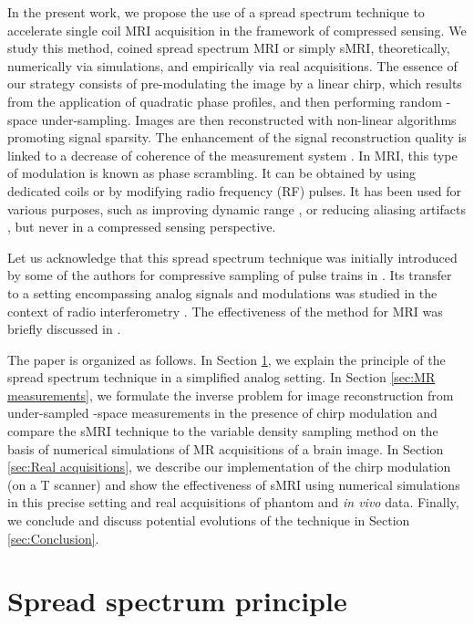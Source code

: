 \documentclass[10pt,draftcls, onecolumn]{IEEEtran}
\begin{document}
In the present work, we propose the use of a spread spectrum technique to accelerate single coil MRI acquisition in the framework of compressed sensing. We study this method, coined spread spectrum MRI or simply sMRI, theoretically, numerically via simulations, and empirically via real acquisitions. The essence of our strategy consists of pre-modulating the image by a linear chirp, which results from the application of quadratic phase profiles, and then performing random -space under-sampling. Images are then reconstructed with non-linear algorithms promoting signal sparsity. The enhancement of the signal reconstruction quality is linked to a decrease of coherence of the measurement system \cite{puy11a, wiaux09b}. In MRI, this type of modulation is known as phase scrambling. It can be obtained by using dedicated coils or by modifying radio frequency (RF) pulses. It has been used for various purposes, such as improving dynamic range \cite{maudsley88, wedeen88}, or reducing aliasing artifacts \cite{pipe95, ito08}, but never in a compressed sensing perspective.

Let us acknowledge that this spread spectrum technique was initially introduced by some of the authors for compressive sampling of pulse trains in \cite{naini09}. Its transfer to a setting encompassing analog signals and modulations was studied in the context of radio interferometry \cite{wiaux09b, wiaux09d, mcewen10}. The effectiveness of the method for MRI was briefly discussed in \cite{puy09, wiaux09c, puy11b}.

The paper is organized as follows. In Section \ref{sec:spread spectrum principle}, we explain the principle of the spread spectrum technique in a simplified analog setting. In Section \ref{sec:MR measurements}, we formulate the inverse problem for image reconstruction from under-sampled -space measurements in the presence of chirp modulation and compare the sMRI technique to the variable density sampling method on the basis of numerical simulations of MR acquisitions of a brain image. In Section \ref{sec:Real acquisitions}, we describe our implementation of the chirp modulation (on a T scanner) and show the effectiveness of sMRI using numerical simulations in this precise setting and real acquisitions of phantom and \emph{in vivo} data. Finally, we conclude and discuss potential evolutions of the
technique in Section \ref{sec:Conclusion}.

\section{Spread spectrum principle}
\label{sec:spread spectrum principle}
\end{document}
